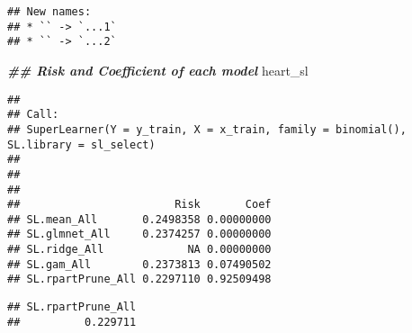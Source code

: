 \documentclass[
]{article}
\newenvironment{Shaded}{\begin{snugshade}}{\end{snugshade}}
\newcommand{\DocumentationTok}[1]{\textcolor[rgb]{0.56,0.35,0.01}{\textbf{\textit{#1}}}}
\newcommand{\FunctionTok}[1]{\textcolor[rgb]{0.13,0.29,0.53}{\textbf{#1}}}
\newcommand{\NormalTok}[1]{#1}
\newcommand{\SpecialCharTok}[1]{\textcolor[rgb]{0.81,0.36,0.00}{\textbf{#1}}}
\begin{document}
\begin{verbatim}
## New names:
## * `` -> `...1`
## * `` -> `...2`
\end{verbatim}

\begin{Shaded}
\begin{Highlighting}[]
\DocumentationTok{\#\# Risk and Coefficient of each model}
\NormalTok{heart\_sl}
\end{Highlighting}
\end{Shaded}

\begin{verbatim}
## 
## Call:  
## SuperLearner(Y = y_train, X = x_train, family = binomial(), SL.library = sl_select) 
## 
## 
## 
##                        Risk       Coef
## SL.mean_All       0.2498358 0.00000000
## SL.glmnet_All     0.2374257 0.00000000
## SL.ridge_All             NA 0.00000000
## SL.gam_All        0.2373813 0.07490502
## SL.rpartPrune_All 0.2297110 0.92509498
\end{verbatim}

\begin{Shaded}
\end{Shaded}

\begin{verbatim}
## SL.rpartPrune_All 
##          0.229711
\end{verbatim}

\begin{Shaded}
\end{Shaded}
\end{document}
